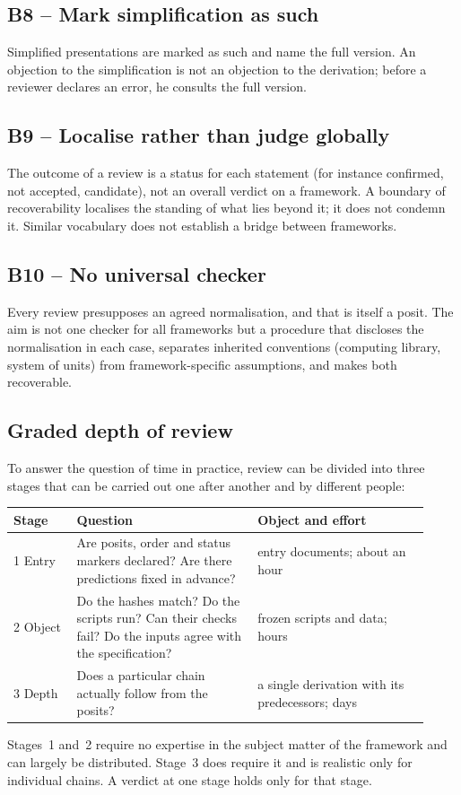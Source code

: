 \subsection*{B8 -- Mark simplification as such}
Simplified presentations are marked as such and name the full version. An objection to
the simplification is not an objection to the derivation; before a reviewer declares an
error, he consults the full version.

\subsection*{B9 -- Localise rather than judge globally}
The outcome of a review is a status for each statement (for instance confirmed, not
accepted, candidate), not an overall verdict on a framework. A boundary of recoverability
localises the standing of what lies beyond it; it does not condemn it. Similar vocabulary
does not establish a bridge between frameworks.

\subsection*{B10 -- No universal checker}
Every review presupposes an agreed normalisation, and that is itself a posit. The aim is
not one checker for all frameworks but a procedure that discloses the normalisation in
each case, separates inherited conventions (computing library, system of units) from
framework-specific assumptions, and makes both recoverable.

\subsection{Graded depth of review}

To answer the question of time in practice, review can be divided into three stages that
can be carried out one after another and by different people:
\begin{center}
\small
\begin{tabular}{@{}p{0.14\linewidth}p{0.40\linewidth}p{0.38\linewidth}@{}}
\toprule
\textbf{Stage} & \textbf{Question} & \textbf{Object and effort} \\
\midrule
1 Entry & Are posits, order and status markers declared? Are there predictions fixed in advance? &
  entry documents; about an hour \\
2 Object & Do the hashes match? Do the scripts run? Can their checks fail? Do the inputs agree with the specification? &
  frozen scripts and data; hours \\
3 Depth & Does a particular chain actually follow from the posits? &
  a single derivation with its predecessors; days \\
\bottomrule
\end{tabular}
\end{center}
Stages~1 and~2 require no expertise in the subject matter of the framework and can largely
be distributed. Stage~3 does require it and is realistic only for individual chains. A
verdict at one stage holds only for that stage.

